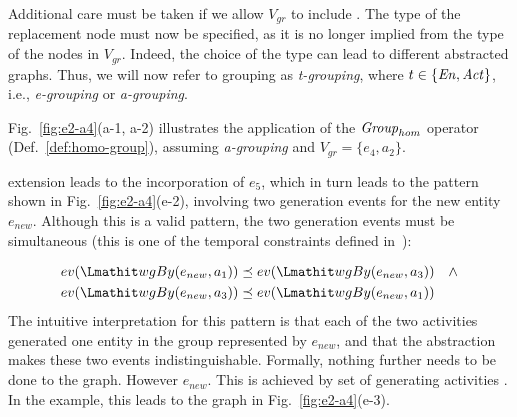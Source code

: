 Additional care must be taken if we allow $V_{gr}$ to include .  The type of the replacement node must now be specified, as it is no longer implied from the type of the nodes in $V_{gr}$. Indeed,  the choice of the type can lead to different abstracted graphs. Thus, we will now refer to grouping as \textit{t-grouping}, where $t \in \{ \mathit{En}, \mathit{Act}\}$, i.e., \textit{e-grouping} or \textit{a-grouping}.

Fig.~\ref{fig:e2-a4}(a-1, a-2) illustrates the application of the $\mathit{Group}_{hom}$ operator (Def.~\ref{def:homo-group}), assuming \textit{a-grouping} and $V_{gr} = \{ e_4, a_2\}$.


%
   extension leads to the incorporation of $e_5$, which in turn leads to the pattern shown in Fig.~\ref{fig:e2-a4}(e-2), involving two generation events for the new entity $e_{new}$.
Although this is a valid pattern, the two generation events must be simultaneous (this is one of the temporal constraints defined in~\citep{w3c-prov-constraints}): 

\begin{align}
ev(\wgby(e_{new}, a_1)) & \preorder ev(\wgby(e_{new}, a_3))  \quad \wedge \\
ev(\wgby(e_{new}, a_3)) & \preorder ev(\wgby(e_{new}, a_1))
\end{align}
The intuitive interpretation for this pattern is that each of the two activities generated one entity in the group represented by $e_{new}$, and that the abstraction makes these two events indistinguishable.  Formally, nothing further needs to be done to the graph.   However 
 $e_{new}$. This is achieved by  set of generating activities .  
In the example, this leads to the graph in Fig.~\ref{fig:e2-a4}(e-3).  


